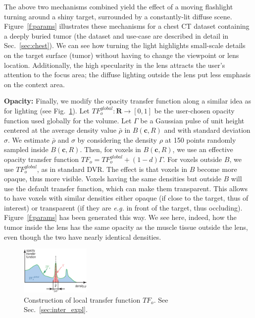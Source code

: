 The above two mechanisms combined yield the effect of a moving flashlight turning around a shiny target, surrounded by a constantly-lit diffuse scene. Figure~\ref{f:params} illustrates these mechanisms for a chest CT dataset containing a deeply buried tumor (the dataset and use-case are described in detail in Sec.~\ref{sec:chest}). We can see how turning the light highlights small-scale details on the target surface (tumor) without having to change the viewpoint or lens location. Additionally, the high specularity in the lens attracts the user's attention to the focus area; the diffuse lighting outside the lens put less emphasis on the context area. 

\vspace{0.2cm}
\noindent\textbf{Opacity:} Finally, we modify the opacity transfer function along a similar idea as for lighting (see Fig.~\ref{fig:tf}). Let $TF_{o}^{global} : \mathbf{R} \rightarrow [0,1]$ be the user-chosen opacity function used globally for the volume. Let $\Gamma$ be a Gaussian pulse of unit height centered at the average density value $\bar{\rho}$ in $B(\mathbf{c},R)$ and with standard deviation $\sigma$. We estimate $\bar{\rho}$ and $\sigma$ by considering the density $\rho$ at 150 points randomly sampled inside $B(\mathbf{c},R)$. Then, for voxels in $B(\mathbf{c},R)$, we use an effective opacity transfer function $TF_o = TF_{o}^{global} + (1-d) \Gamma$. For voxels outside $B$, we use $TF_{o}^{global}$, as in standard DVR. The effect is that voxels in $B$ become more opaque, thus more visible. Voxels having the same densities but outside $B$ will use the default transfer function, which can make them transparent. This allows to have voxels with similar densities either opaque (if close to the target, thus of interest) or transparent (if they are \emph{e.g.} in front of the target, thus occluding). Figure~\ref{f:params} has been generated this way. We see here, indeed, how the tumor inside the lens has the same opacity as the muscle tissue outside the lens, even though the two have nearly identical densities.

\begin{figure}[htbp!]
\centering
\includegraphics[width=0.3\textwidth]{images/tf.eps}
\caption{Construction of local transfer function $TF_{o}$. See Sec.~\ref{sec:inter_expl}.}
\label{fig:tf}
\end{figure}


